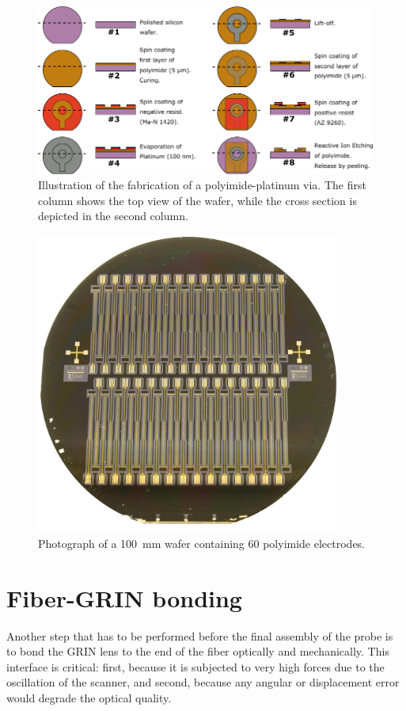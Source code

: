 \begin{figure}[h!]\centering \includegraphics[width=15cm]{figures/40_Fabrication/PI/processH.pdf}
      \caption{Illustration of the fabrication of a polyimide-platinum via. The first column shows the top view of the wafer, while the cross section is depicted in the second column.}
      \label{fig:piProcess}
\end{figure}

\begin{figure}[h!]\centering \includegraphics[width=10cm]{figures/40_Fabrication/PI/wafer.JPG}
      \caption{Photograph of a \SI{100}{\milli\meter} wafer containing 60 polyimide electrodes.}
      \label{fig:piwafer}
\end{figure}

\clearpage
\section{Fiber-GRIN bonding}
\label{sec:fiberGRIN}
Another step that has to be performed before the final assembly of the probe is to bond the GRIN lens to the end of the fiber optically and mechanically. This interface is critical: first, because it is subjected to very high forces due to the oscillation of the scanner, and second, because any angular or displacement error would degrade the optical quality.

